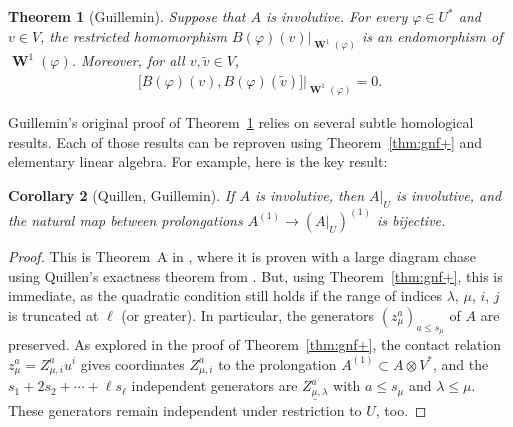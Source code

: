 \documentclass[pdftex]{sigma}
\numberwithin{equation}{section}
\newtheorem{Theorem}{Theorem}[section]
\newtheorem{Corollary}[Theorem]{Corollary}
\DeclareMathOperator{\Wu}{\mathbf{W}}
\begin{document}
\begin{Theorem}[Guillemin]\label{thm:gnf1}
Suppose that $A$ is involutive.
For every $\varphi \in U^*$ and $v \in V$, the restricted homomorphism
$B(\varphi)(v)|_{\Wu^1(\varphi)}$ is an endomorphism of $\Wu^1(\varphi)$.
Moreover, for all \mbox{$v, \tilde{v} \in V$},
\begin{gather} \big[
B(\varphi)(v),
B(\varphi)(\tilde{v})\big]\big|_{\Wu^1(\varphi)}
=0.
\label{eq:gnf1}
\end{gather}
\end{Theorem}

Guillemin's original proof of Theorem~\ref{thm:gnf1} relies on several subtle homological
results.  Each of those results can be reproven using Theorem~\ref{thm:gnf+}
and elementary linear algebra.  For example, here is the key result:

\begin{Corollary}[Quillen, Guillemin]\label{thm:guilA}
If $A$ is involutive, then $A|_U$ is involutive, and the natural map
between prolongations $A^{(1)} \to  (A|_U )^{(1)}$ is bijective.
\end{Corollary}

\begin{proof}
This is Theorem~A in \cite{Guillemin1968}, where it
is proven with a large
diagram chase using Quillen's exactness theorem from \cite{Quillen1964}.  But, using Theorem~\ref{thm:gnf+}, this
is immediate, as the quadratic condition still holds if the range of indices
$\lambda$, $\mu$, $i$, $j$ is truncated at $\ell$ (or greater).  In particular, the generators $( z^a_\mu )_{a \leq s_\mu}$ of $A$ are preserved.
As explored in the proof of Theorem~\ref{thm:gnf+}, the contact relation $z^a_\mu = Z^{a}_{\mu,i} u^i$ gives
coordinates $Z^a_{\mu,i}$ to the prolongation $A^{(1)} \subset A \otimes V^*$,
and the $s_1 + 2s_2 + \cdots + \ell s_\ell$ independent generators are
$\underline{Z^a_{\mu,\lambda}}$ with $a \leq s_\mu$ and
$\lambda  \leq \mu$.  These generators remain independent under restriction
to $U$, too.
\end{proof}
\end{document}
